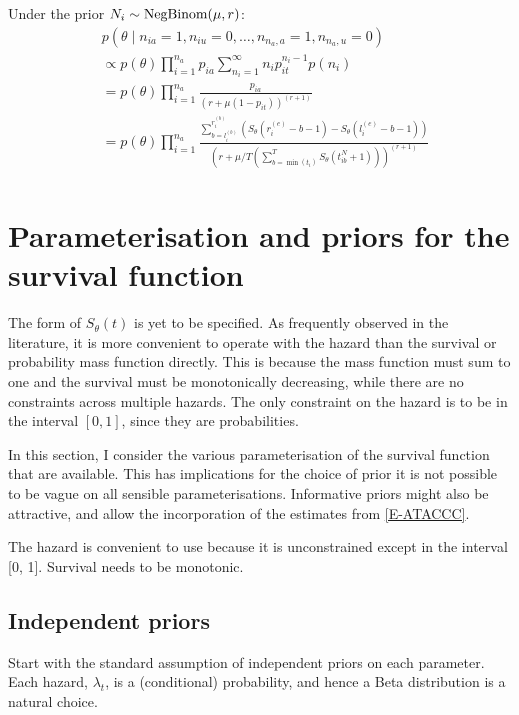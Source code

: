 \documentclass[thesis.tex]{subfiles}
\begin{document}
Under the prior $N_i \sim \text{NegBinom}(\mu, r)$:
\begin{align}
&p(\theta \mid n_{ia} = 1, n_{iu} = 0, \dots, n_{n_a,a} = 1, n_{n_a,u} = 0) \\
&\propto p(\theta) \prod_{i=1}^{n_a} p_{ia} \sum_{n_i=1}^\infty n_i p_{it}^{n_i- 1} p(n_i) \\
&= p(\theta) \prod_{i=1}^{n_a} \frac{p_{ia}}{(r+\mu (1-p_{it}))^{(r+1)}} \\
&= p(\theta) \prod_{i=1}^{n_a} \frac{\sum_{b=l_i^{(b)}}^{r_i^{(b)}} \left( S_\theta(r_i^{(e)} - b - 1) - S_\theta(l_i^{(e)} - b - 1) \right)}{\left( r+\mu/T \left( \sum_{b=\min(t_i)}^T S_\theta(t_{ib}^N + 1) \right) \right)^{(r+1)}} \\
\end{align}

\section{Parameterisation and priors for the survival function} \label{perf-test:sec:parameters-priors}

The form of $S_\theta(t)$ is yet to be specified.
As frequently observed in the literature, it is more convenient to operate with the hazard than the survival or probability mass function directly.
This is because the mass function must sum to one and the survival must be monotonically decreasing, while there are no constraints across multiple hazards.
The only constraint on the hazard is to be in the interval $[0, 1]$, since they are probabilities.

In this section, I consider the various parameterisation of the survival function that are available.
This has implications for the choice of prior it is not possible to be vague on all sensible parameterisations.
Informative priors might also be attractive, and allow the incorporation of the estimates from \cref{E-ATACCC}.

The hazard is convenient to use because it is unconstrained except in the interval [0, 1].
Survival needs to be monotonic.

\subsection{Independent priors} \label{perf-test:sec:independent-priors}
Start with the standard assumption of independent priors on each parameter.
Each hazard, $\lambda_t$, is a (conditional) probability, and hence a Beta distribution is a natural choice.
\end{document}
